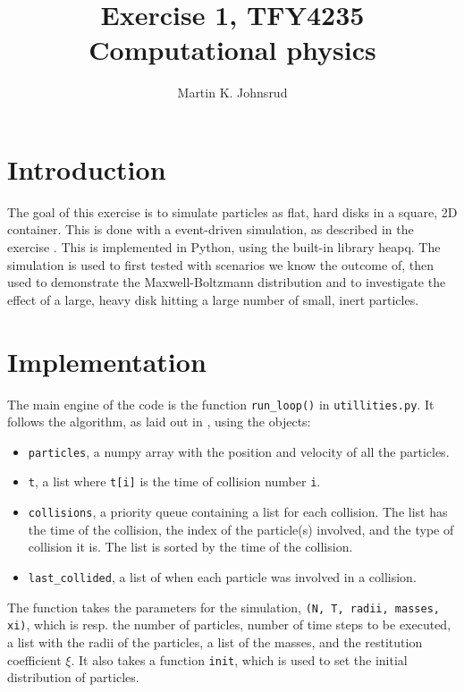 \documentclass{article}
\title{Exercise 1, TFY4235 Computational physics}
\author{Martin K. Johnsrud}
\date{}
\begin{document}
    \maketitle
    \section*{Introduction}
    The goal of this exercise is to simulate particles as flat, hard disks in a square, 2D container. This is done with a event-driven simulation, as described in the exercise \cite{exercise}. This is implemented in Python, using the built-in library heapq. The simulation is used to first tested with scenarios we know the outcome of, then used to demonstrate the Maxwell-Boltzmann distribution and to investigate the effect of a large, heavy disk hitting a large number of small, inert particles.

    \section*{Implementation}
    The main engine of the code is the function \verb|run_loop()| in \verb|utillities.py|. It follows the algorithm, as laid out in \cite{exercise}, using the objects:
    \begin{itemize}
        \item \verb|particles|, a numpy array with the position and velocity of all the particles.
        \item \verb|t|, a list where \verb|t[i]| is the time of collision number \verb|i|.
        \item \verb|collisions|, a priority queue containing a list for each collision. The list has the time of the collision, the index of the particle(s) involved, and the type of collision it is. The list is sorted by the time of the collision.
        \item \verb|last_collided|, a list of when each particle was involved in a collision.
    \end{itemize}
    The function takes the parameters for the simulation, \verb|(N, T, radii, masses, xi)|, which is resp. the number of particles, number of time steps to be executed, a list with the radii of the particles, a list of the masses, and the restitution coefficient $\xi$. It also takes a function \verb|init|, which is used to set the initial distribution of particles. 
    
\end{document}
